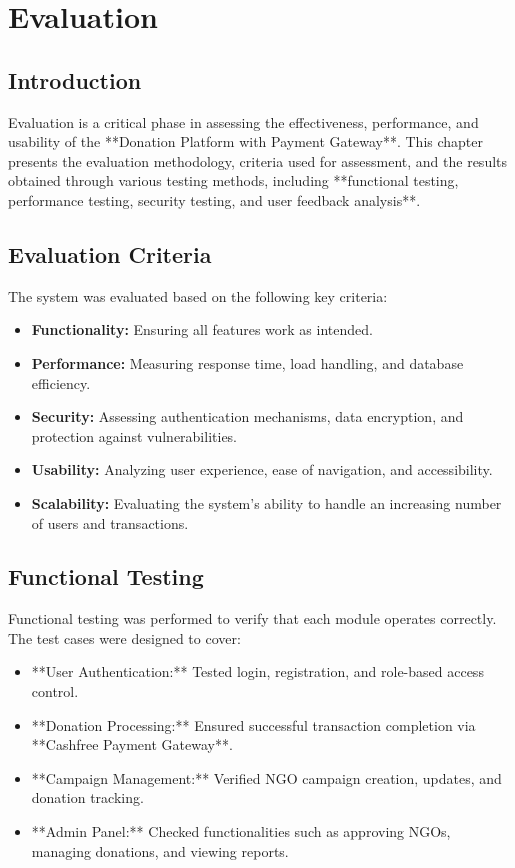 \chapter{Evaluation}

\section{Introduction}
Evaluation is a critical phase in assessing the effectiveness, performance, and usability of the **Donation Platform with Payment Gateway**. This chapter presents the evaluation methodology, criteria used for assessment, and the results obtained through various testing methods, including **functional testing, performance testing, security testing, and user feedback analysis**.

\section{Evaluation Criteria}
The system was evaluated based on the following key criteria:

\begin{itemize}
    \item \textbf{Functionality:} Ensuring all features work as intended.
    \item \textbf{Performance:} Measuring response time, load handling, and database efficiency.
    \item \textbf{Security:} Assessing authentication mechanisms, data encryption, and protection against vulnerabilities.
    \item \textbf{Usability:} Analyzing user experience, ease of navigation, and accessibility.
    \item \textbf{Scalability:} Evaluating the system's ability to handle an increasing number of users and transactions.
\end{itemize}

\section{Functional Testing}
Functional testing was performed to verify that each module operates correctly. The test cases were designed to cover:

\begin{itemize}
    \item **User Authentication:** Tested login, registration, and role-based access control.
    \item **Donation Processing:** Ensured successful transaction completion via **Cashfree Payment Gateway**.
    \item **Campaign Management:** Verified NGO campaign creation, updates, and donation tracking.
    \item **Admin Panel:** Checked functionalities such as approving NGOs, managing donations, and viewing reports.
\end{itemize}

